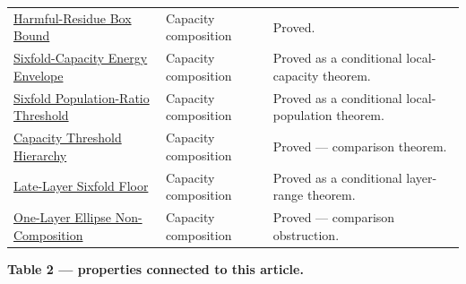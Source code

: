 {\begin{longtable}{>{\raggedright\arraybackslash}p{}>{\raggedright\arraybackslash}p{}>{\raggedright\arraybackslash}p{}}
\href{https://github.com/thiagomata/prime-numbers/blob/master/properties/sieve-sequence/sharp-harmful-residue-box-inside-collision-ellipse.md}{Harmful-Residue Box Bound} & Capacity composition & Proved.\\
\href{https://github.com/thiagomata/prime-numbers/blob/master/properties/sieve-sequence/sharp-sixfold-capacity-harmful-energy-envelope.md}{Sixfold-Capacity Energy Envelope} & Capacity composition & Proved as a conditional local-capacity theorem.\\
\href{https://github.com/thiagomata/prime-numbers/blob/master/properties/sieve-sequence/sharp-sixfold-capacity-population-ratio-threshold.md}{Sixfold Population-Ratio Threshold} & Capacity composition & Proved as a conditional local-population theorem.\\
\href{https://github.com/thiagomata/prime-numbers/blob/master/properties/sieve-sequence/capacity-population-threshold-hierarchy.md}{Capacity Threshold Hierarchy} & Capacity composition & Proved --- comparison theorem.\\
\href{https://github.com/thiagomata/prime-numbers/blob/master/properties/sieve-sequence/late-layer-sixfold-floor-controls-harmful-energy.md}{Late-Layer Sixfold Floor} & Capacity composition & Proved as a conditional layer-range theorem.\\
\href{https://github.com/thiagomata/prime-numbers/blob/master/properties/sieve-sequence/one-layer-harmful-ellipses-do-not-compose.md}{One-Layer Ellipse Non-Composition} & Capacity composition & Proved --- comparison obstruction.\\
\hline
\end{longtable}
\par}

\noindent \textbf{Table 2 --- properties connected to this article.}

